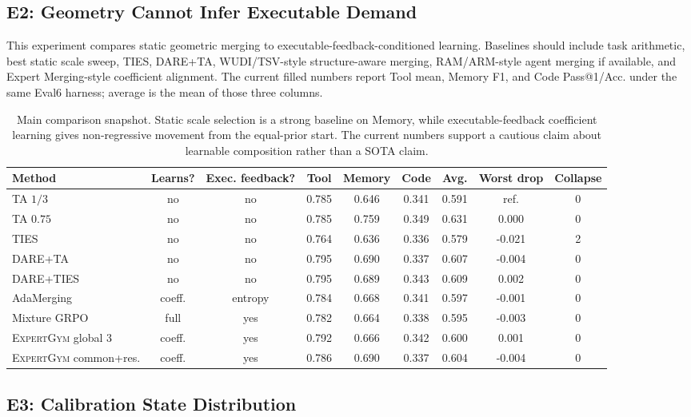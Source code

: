 \documentclass[11pt]{article}
\newcommand{\method}{\textsc{ExpertGym}\xspace}
\begin{document}
\subsection{E2: Geometry Cannot Infer Executable Demand}

This experiment compares static geometric merging to executable-feedback-conditioned learning.  Baselines should include task arithmetic, best static scale sweep, TIES, DARE+TA, WUDI/TSV-style structure-aware merging, RAM/ARM-style agent merging if available, and Expert Merging-style coefficient alignment.  The current filled numbers report Tool mean, Memory F1, and Code Pass@1/Acc. under the same Eval6 harness; average is the mean of those three columns.

\begin{table}[t]
\centering
\small
\setlength{\tabcolsep}{3.2pt}
\begin{tabular}{lcccccccc}
\toprule
Method & Learns? & Exec. feedback? & Tool & Memory & Code & Avg. & Worst drop & Collapse \\
\midrule
TA $1/3$ & no & no & 0.785 & 0.646 & 0.341 & 0.591 & ref. & 0 \\
TA $0.75$ & no & no & 0.785 & 0.759 & 0.349 & 0.631 & 0.000 & 0 \\
TIES & no & no & 0.764 & 0.636 & 0.336 & 0.579 & -0.021 & 2 \\
DARE+TA & no & no & 0.795 & 0.690 & 0.337 & 0.607 & -0.004 & 0 \\
DARE+TIES & no & no & 0.795 & 0.689 & 0.343 & 0.609 & 0.002 & 0 \\
AdaMerging & coeff. & entropy & 0.784 & 0.668 & 0.341 & 0.597 & -0.001 & 0 \\
Mixture GRPO & full & yes & 0.782 & 0.664 & 0.338 & 0.595 & -0.003 & 0 \\
\method global 3 & coeff. & yes & 0.792 & 0.666 & 0.342 & 0.600 & 0.001 & 0 \\
\method common+res. & coeff. & yes & 0.786 & 0.690 & 0.337 & 0.604 & -0.004 & 0 \\
\bottomrule
\end{tabular}
\caption{Main comparison snapshot.  Static scale selection is a strong baseline on Memory, while executable-feedback coefficient learning gives non-regressive movement from the equal-prior start.  The current numbers support a cautious claim about learnable composition rather than a SOTA claim.}
\label{tab:main}
\end{table}

\subsection{E3: Calibration State Distribution}
\end{document}
